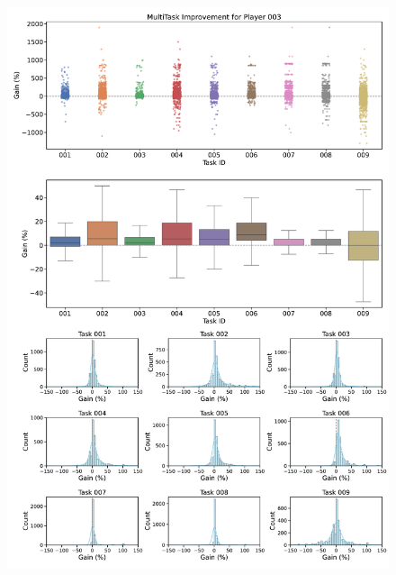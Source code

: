 \begin{figure}[ht]
  \centering
  \includegraphics[width=\textwidth]{figures/gain_validity/multitask/multitask_gain_player_00003.pdf}
\end{figure}
\clearpage

